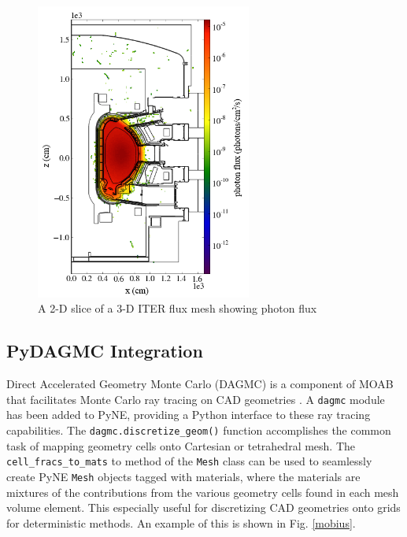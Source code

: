 \documentclass{anstrans}
\begin{document}
\begin{figure}
    \centering
    \includegraphics[width=7.1cm, angle =0]{iter_slice.png}
    \caption{A 2-D slice of a 3-D ITER flux mesh showing photon flux}
    \label{ITER}
\end{figure}


\subsection{PyDAGMC Integration}

Direct Accelerated Geometry Monte Carlo (DAGMC) is a component of MOAB that
facilitates Monte Carlo ray tracing on CAD geometries
\cite{tautges_acceleration_2009}.  A \texttt{dagmc} module has been added to
PyNE, providing a Python interface to these ray tracing capabilities. The
\texttt{dagmc.discretize\_geom()} function accomplishes the common task of
mapping geometry cells onto Cartesian or tetrahedral mesh. The
\texttt{cell\_fracs\_to\_mats} to method of the \texttt{Mesh} class can be used
to seamlessly create PyNE \texttt{Mesh} objects tagged with materials, where
the materials are mixtures of the contributions from the various geometry cells
found in each mesh volume element. This especially useful for discretizing CAD
geometries onto grids for deterministic methods. An example of this is shown in
Fig. \ref{mobius}.
\end{document}
